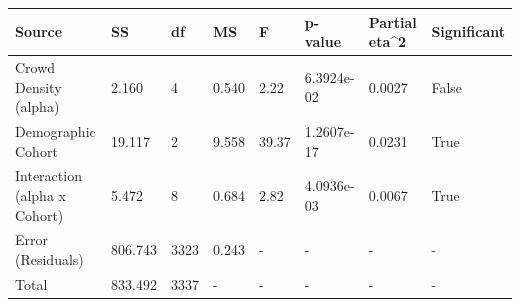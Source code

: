 \begin{tabular}{llllllll}
\hline
Source & SS & df & MS & F & p-value & Partial eta^2 & Significant \\ \hline
Crowd Density (alpha) & 2.160 & 4 & 0.540 & 2.22 & 6.3924e-02 & 0.0027 & False \\
Demographic Cohort & 19.117 & 2 & 9.558 & 39.37 & 1.2607e-17 & 0.0231 & True \\
Interaction (alpha x Cohort) & 5.472 & 8 & 0.684 & 2.82 & 4.0936e-03 & 0.0067 & True \\
Error (Residuals) & 806.743 & 3323 & 0.243 & - & - & - & - \\
Total & 833.492 & 3337 & - & - & - & - & - \\
\hline
\end{tabular}
